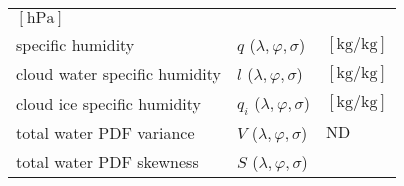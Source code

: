 \begin{longtable}[]{@{}lll@{}}
\begin{minipage}[t]{0.30\columnwidth}
\(\mathrm{[hPa]}\)\strut
\end{minipage}\tabularnewline
\begin{minipage}[t]{0.30\columnwidth}\raggedright
specific humidity\strut
\end{minipage} & \begin{minipage}[t]{0.30\columnwidth}\raggedright
\(q\) (\(\lambda,\varphi,\sigma\))\strut
\end{minipage} & \begin{minipage}[t]{0.30\columnwidth}\raggedright
\(\mathrm{[kg/kg]}\)\strut
\end{minipage}\tabularnewline
\begin{minipage}[t]{0.30\columnwidth}\raggedright
cloud water specific humidity\strut
\end{minipage} & \begin{minipage}[t]{0.30\columnwidth}\raggedright
\(l\) (\(\lambda,\varphi,\sigma\))\strut
\end{minipage} & \begin{minipage}[t]{0.30\columnwidth}\raggedright
\(\mathrm{[kg/kg]}\)\strut
\end{minipage}\tabularnewline
\begin{minipage}[t]{0.30\columnwidth}\raggedright
cloud ice specific humidity\strut
\end{minipage} & \begin{minipage}[t]{0.30\columnwidth}\raggedright
\(q_i\) (\(\lambda,\varphi,\sigma\))\strut
\end{minipage} & \begin{minipage}[t]{0.30\columnwidth}\raggedright
\(\mathrm{[kg/kg]}\)\strut
\end{minipage}\tabularnewline
\begin{minipage}[t]{0.30\columnwidth}\raggedright
total water PDF variance\strut
\end{minipage} & \begin{minipage}[t]{0.30\columnwidth}\raggedright
\(V\) (\(\lambda,\varphi,\sigma\))\strut
\end{minipage} & \begin{minipage}[t]{0.30\columnwidth}\raggedright
\(\mathrm{ND}\)\strut
\end{minipage}\tabularnewline
\begin{minipage}[t]{0.30\columnwidth}\raggedright
total water PDF skewness\strut
\end{minipage} & \begin{minipage}[t]{0.30\columnwidth}\raggedright
\(S\) (\(\lambda,\varphi,\sigma\))\strut

\end{minipage}
\end{longtable}

